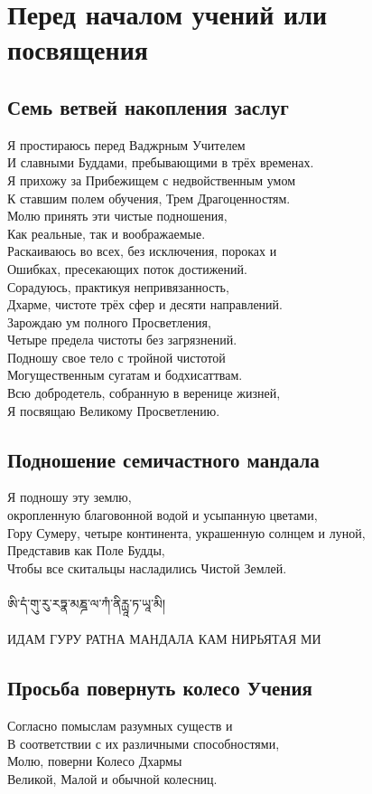 \section{Перед началом учений или посвящения}

\subsection{Семь ветвей накопления заслуг}

Я простираюсь перед Ваджрным Учителем\\
И славными Буддами, пребывающими в трёх временах.\\
Я прихожу за Прибежищем с недвойственным умом\\
К ставшим полем обучения, Трем Драгоценностям.\\
Молю принять эти чистые подношения,\\
Как реальные, так и воображаемые.\\
Раскаиваюсь во всех, без исключения, пороках и\\
Ошибках, пресекающих поток достижений.\\
Сорадуюсь, практикуя непривязанность,\\
Дхарме, чистоте трёх сфер и десяти направлений.\\
Зарождаю ум полного Просветления,\\
Четыре предела чистоты без загрязнений.\\
Подношу свое тело с тройной чистотой\\
Могущественным сугатам и бодхисаттвам.\\
Всю добродетель, собранную в веренице жизней,\\
Я посвящаю Великому Просветлению.
\newpage

\subsection{Подношение семичастного мандала}

Я подношу эту землю, \\
\indent окропленную благовонной водой и усыпанную цветами,\\
Гору Сумеру, четыре континента, украшенную солнцем и луной,\\
Представив как Поле Будды,\\
Чтобы все скитальцы насладились Чистой Землей.\\
\\
\ti
ཨི་དཾ་གུ་རུ་རཏྣ་མཎྜ་ལ་ཀཾ་ནིརྻཱ་ཏ་ཡཱ་མི།\\
\\
\ru ИДАМ ГУРУ РАТНА МАНДАЛА КАМ НИРЬЯТАЯ МИ

\subsection{Просьба повернуть колесо Учения}

Согласно помыслам разумных существ и\\
В соответствии с их различными способностями,\\
Молю, поверни Колесо Дхармы\\
Великой, Малой и обычной колесниц.
